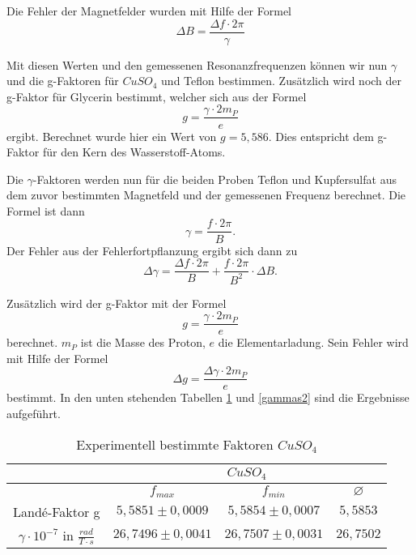 Die Fehler der Magnetfelder wurden mit Hilfe der Formel
\begin{equation}
 \Delta B = \frac{\Delta f \cdot 2\pi}{\gamma}
\end{equation}


Mit diesen Werten und den gemessenen Resonanzfrequenzen können wir nun $\gamma$ und die g-Faktoren für $CuSO_4$ und Teflon bestimmen. Zusätzlich wird noch der g-Faktor für Glycerin bestimmt, welcher sich aus der Formel
\begin{equation}
 g = \frac{\gamma\cdot 2m_P}{e}
\end{equation}
ergibt. Berechnet wurde hier ein Wert von $g= 5,586$. Dies entspricht dem g-Faktor für den Kern des Wasserstoff-Atoms.

Die $\gamma$-Faktoren werden nun für die beiden Proben Teflon und Kupfersulfat aus dem zuvor bestimmten Magnetfeld und der gemessenen Frequenz berechnet. Die Formel ist dann
\begin{equation}
 \gamma = \frac{f\cdot 2\pi}{B}.
\end{equation}
Der Fehler aus der Fehlerfortpflanzung ergibt sich dann zu
\begin{equation}
 \Delta \gamma = \frac{\Delta f\cdot 2\pi}{B} + \frac{f\cdot 2\pi}{B^2}\cdot \Delta B.
\end{equation}

Zusätzlich wird der g-Faktor mit der Formel
\begin{equation}
 g = \frac{\gamma\cdot 2 m_P}{e}
\end{equation}
berechnet. $m_P$ ist die Masse des Proton, $e$ die Elementarladung. Sein Fehler wird mit Hilfe der Formel
\begin{equation}
 \Delta g = \frac{\Delta \gamma \cdot 2 m_P}{e}
\end{equation}
bestimmt. In den unten stehenden Tabellen \ref{gammas1} und \ref{gammas2} sind die Ergebnisse aufgeführt.


\begin{table}[h]
	\caption{Experimentell bestimmte Faktoren $CuSO_4$}
	\begin{tabular}{|c|c|c|c|}
	\hline
	& \multicolumn{3}{|c|}{$CuSO_4$}\\ \hline
	& $f_{max}$ & $f_{min}$  & $\varnothing $  \\ \hline
	Landé-Faktor g & $5,5851\pm0,0009$ & $5,5854\pm0,0007$ & $5,5853$\\ \hline
	$\gamma \cdot 10^{-7}$ in $\frac{rad}{T\cdot s}$& $26,7496 \pm 0,0041$ & $26,7507\pm0,0031$ &  $26,7502$\\ \hline
	\end{tabular}
\label{gammas1}
\end{table}	

